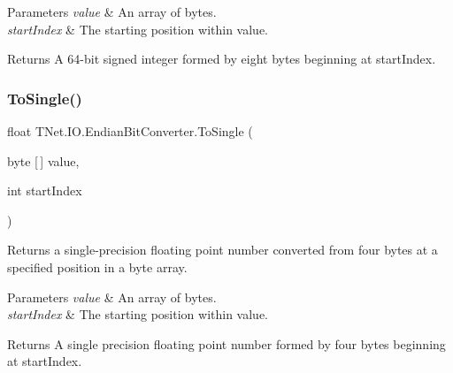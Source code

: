 \begin{DoxyParams}{Parameters}
{\em value} & An array of bytes.\\
\hline
{\em start\+Index} & The starting position within value.\\
\hline
\end{DoxyParams}
\begin{DoxyReturn}{Returns}
A 64-\/bit signed integer formed by eight bytes beginning at start\+Index.
\end{DoxyReturn}
\mbox{\label{class_t_net_1_1_i_o_1_1_endian_bit_converter_a8f2ff9046650f0fea88be0cd90b7ef26}} 
\subsubsection{\texorpdfstring{To\+Single()}{ToSingle()}}
{\footnotesize\ttfamily float T\+Net.\+I\+O.\+Endian\+Bit\+Converter.\+To\+Single (\begin{DoxyParamCaption}\item[{byte \mbox{[}$\,$\mbox{]}}]{value,  }\item[{int}]{start\+Index }\end{DoxyParamCaption})}



Returns a single-\/precision floating point number converted from four bytes at a specified position in a byte array. 


\begin{DoxyParams}{Parameters}
{\em value} & An array of bytes.\\
\hline
{\em start\+Index} & The starting position within value.\\
\hline
\end{DoxyParams}
\begin{DoxyReturn}{Returns}
A single precision floating point number formed by four bytes beginning at start\+Index.
\end{DoxyReturn}
\mbox{\label{class_t_net_1_1_i_o_1_1_endian_bit_converter_a2d1c19944491257c2f73b50a39034bac}} 
